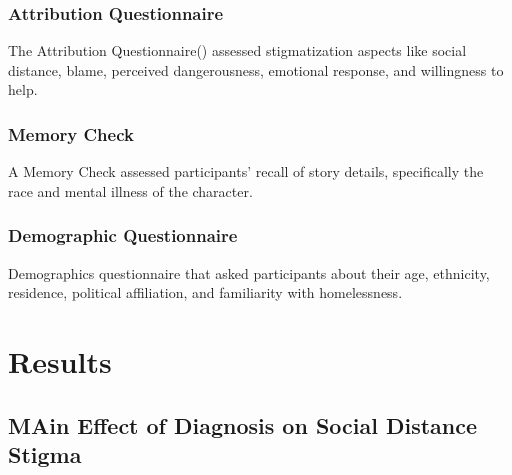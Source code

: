 \documentclass[
  man,
  floatsintext,
  longtable,
  nolmodern,
  notxfonts,
  notimes,
  colorlinks=true,linkcolor=blue,citecolor=blue,urlcolor=blue]{apa7}
\begin{document}
\subsubsection{Attribution
Questionnaire}\label{attribution-questionnaire}

The Attribution
Questionnaire() assessed stigmatization aspects like social
distance, blame, perceived dangerousness, emotional response, and
willingness to help.

\subsubsection{Memory Check}\label{memory-check}

A Memory Check assessed participants' recall of story details,
specifically the race and mental illness of the character.

\subsubsection{Demographic
Questionnaire}\label{demographic-questionnaire}

Demographics questionnaire that asked participants about their age,
ethnicity, residence, political affiliation, and familiarity with
homelessness.

\section{Results}\label{results}

\subsection{MAin Effect of Diagnosis on Social Distance
Stigma}\label{main-effect-of-diagnosis-on-social-distance-stigma}
\end{document}
